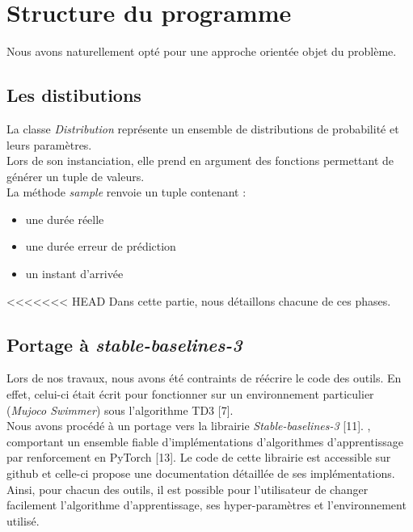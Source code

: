 \documentclass[12pt]{article}
\begin{document}
\newpage
\section{Structure du programme}

Nous avons naturellement opté pour une approche orientée objet du problème.

\subsection{Les distibutions}
La classe \emph{Distribution} représente un ensemble de distributions de probabilité et leurs paramètres. \\

Lors de son instanciation, elle prend en argument des fonctions permettant de générer un tuple de valeurs. \\

La méthode \emph{sample} renvoie un tuple contenant :
\begin{itemize}
	\item une durée réelle
	\item une durée erreur de prédiction
	\item un instant d'arrivée
\end{itemize}

<<<<<<< HEAD
Dans cette partie, nous détaillons chacune de ces phases.

\subsection*{Portage à \emph{stable-baselines-3}}

Lors de nos travaux, nous avons été contraints de réécrire le code des outils. En effet, celui-ci était écrit pour fonctionner sur un environnement particulier (\emph{Mujoco Swimmer}) sous l’algorithme TD3 [7]. \\

Nous avons procédé à un portage vers la librairie \emph{Stable-baselines-3} [11].
, comportant un ensemble fiable d’implémentations d’algorithmes d’apprentissage par renforcement en PyTorch [13]. Le code de cette librairie est accessible sur github et celle-ci propose une documentation détaillée de ses implémentations. \\

Ainsi, pour chacun des outils, il est possible pour l’utilisateur de changer facilement l’algorithme d’apprentissage, ses hyper-paramètres et l’environnement utilisé. \\
\end{document}

